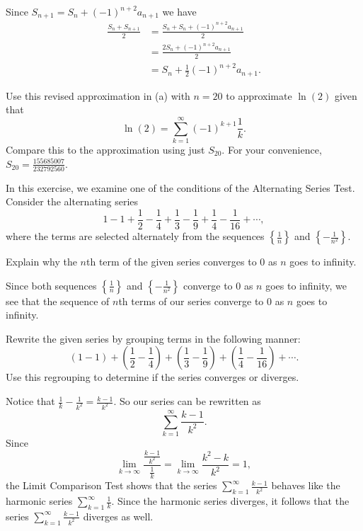 \begin{exercises}
\begin{exerciseSolution}

Since $S_{n+1} = S_n + (-1)^{n+2}a_{n+1}$ we have
\begin{align*}
\frac{S_n+S_{n+1}}{2} &= \frac{S_n+S_{n} + (-1)^{n+2}a_{n+1}}{2} \\
    &= \frac{2S_{n} + (-1)^{n+2}a_{n+1}}{2} \\
    &= S_n + \frac{1}{2}(-1)^{n+2}a_{n+1}.
\end{align*}

\end{exerciseSolution}

    \item Use this revised approximation in (a) with $n = 20$ to approximate $\ln(2)$ given that
    \[\ln(2) = \sum_{k=1}^{\infty} (-1)^{k+1} \frac{1}{k}.\]
    Compare this to the approximation using just $S_{20}$. For your convenience, $S_{20} = \frac{155685007}{232792560}$.

    \ea

\item In this exercise, we examine one of the conditions of the Alternating Series Test. Consider the alternating series
\[1 - 1 + \frac{1}{2} - \frac{1}{4} + \frac{1}{3} - \frac{1}{9} + \frac{1}{4} - \frac{1}{16} + \cdots,\]
where the terms are selected alternately from the sequences $\left\{\frac{1}{n}\right\}$ and $\left\{-\frac{1}{n^2}\right\}$.
    \ba
    \item Explain why the $n$th term of the given series converges to 0 as $n$ goes to infinity. 

\begin{exerciseSolution}

Since both sequences $\left\{\frac{1}{n}\right\}$ and $\left\{-\frac{1}{n^2}\right\}$ converge to 0 as $n$ goes to infinity, we see that the sequence of $n$th terms of our series converge to 0 as $n$ goes to infinity.    

\end{exerciseSolution}
 
    \item Rewrite the given series by grouping terms in the following manner:
\[(1 - 1) + \left(\frac{1}{2} - \frac{1}{4}\right) + \left(\frac{1}{3} - \frac{1}{9}\right) + \left(\frac{1}{4} - \frac{1}{16}\right) + \cdots. \]
Use this regrouping to determine if the series converges or diverges. 

\begin{exerciseSolution}
Notice that $\frac{1}{k} - \frac{1}{k^2} = \frac{k-1}{k^2}$. So our series can be rewritten as
\[\sum_{k=1}^{\infty} \frac{k-1}{k^2}.\]
Since 
\[\lim_{k \to \infty} \frac{ \frac{k-1}{k^2} }{ \frac{1}{k} } = \lim_{k \to \infty} \frac{k^2-k}{k^2} = 1,\]
the Limit Comparison Test shows that the series $\sum_{k=1}^{\infty} \frac{k-1}{k^2}$ behaves like the harmonic series $\sum_{k=1}^{\infty} \frac{1}{k}$. Since the harmonic series diverges, it follows that the series $\sum_{k=1}^{\infty} \frac{k-1}{k^2}$ diverges as well. 


\end{exerciseSolution}
\end{exercises}

